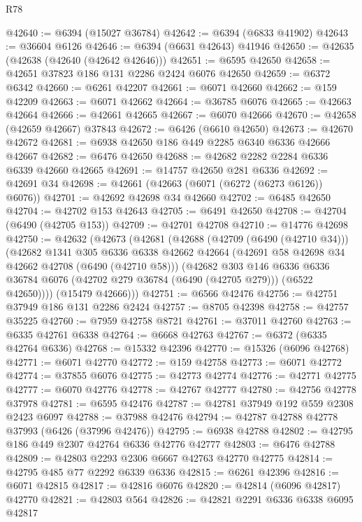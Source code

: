 \begin{lexlean}{R78}
\begin{coremodule}
@42640 := @6394 (@15027 @36784)
@42642 := @6394 (@6833 @41902)
@42643 := @36604 @6126
@42646 := @6394 (@6631 @42643) @41946
@42650 := @42635 (@42638 (@42640 (@42642 @42646)))
@42651 := @6595 @42650
@42658 := @42651 @37823 @186 @131 @2286 @2424 @6076 @42650
@42659 := @6372 @6342
@42660 := @6261 @42207
@42661 := @6071 @42660
@42662 := @159 @42209
@42663 := @6071 @42662
@42664 := @36785 @6076
@42665 := @42663 @42664
@42666 := @42661 @42665
@42667 := @6070 @42666
@42670 := @42658 (@42659 @42667) @37843
@42672 := @6426 (@6610 @42650)
@42673 := @42670 @42672
@42681 := @6938 @42650 @186 @449 @2285 @6340 @6336 @42666 @42667
@42682 := @6476 @42650
@42688 := @42682 @2282 @2284 @6336 @6339 @42660 @42665
@42691 := @14757 @42650 @281 @6336
@42692 := @42691 @34
@42698 := @42661 (@42663 (@6071 (@6272 (@6273 @6126)) @6076))
@42701 := @42692 @42698 @34 @42660
@42702 := @6485 @42650
@42704 := @42702 @153 @42643
@42705 := @6491 @42650
@42708 := @42704 (@6490 (@42705 @153))
@42709 := @42701 @42708
@42710 := @14776 @42698
@42750 := @42632
    (@42673
      (@42681
        (@42688
          (@42709 (@6490 (@42710 @34)))
          (@42682
            @1341
            @305
            @6336
            @6338
            @42662
            @42664
            (@42691 @58 @42698 @34 @42662 @42708 (@6490 (@42710 @58)))
            (@42682
              @303
              @146
              @6336
              @6336
              @36784
              @6076
              (@42702 @279 @36784 (@6490 (@42705 @279)))
              (@6522 @42650))))
        (@15479 @42666)))
@42751 := @6566 @42476
@42756 := @42751 @37949 @186 @131 @2286 @2424
@42757 := @8705 @42398
@42758 := @42757 @35225
@42760 := @7959 @42758 @8721
@42761 := @37011 @42760
@42763 := @6335 @42761 @6338
@42764 := @6668 @42763
@42767 := @6372 (@6335 @42764 @6336)
@42768 := @15332 @42396
@42770 := @15326 (@6096 @42768)
@42771 := @6071 @42770
@42772 := @159 @42758
@42773 := @6071 @42772
@42774 := @37855 @6076
@42775 := @42773 @42774
@42776 := @42771 @42775
@42777 := @6070 @42776
@42778 := @42767 @42777
@42780 := @42756 @42778 @37978
@42781 := @6595 @42476
@42787 := @42781 @37949 @192 @559 @2308 @2423 @6097
@42788 := @37988 @42476
@42794 := @42787 @42788 @42778 @37993 (@6426 (@37996 @42476))
@42795 := @6938 @42788
@42802 := @42795 @186 @449 @2307 @42764 @6336 @42776 @42777
@42803 := @6476 @42788
@42809 := @42803 @2293 @2306 @6667 @42763 @42770 @42775
@42814 := @42795 @485 @77 @2292 @6339 @6336
@42815 := @6261 @42396
@42816 := @6071 @42815
@42817 := @42816 @6076
@42820 := @42814 (@6096 @42817) @42770
@42821 := @42803 @564
@42826 := @42821 @2291 @6336 @6338 @6095 @42817

\end{coremodule}
\end{lexlean}
